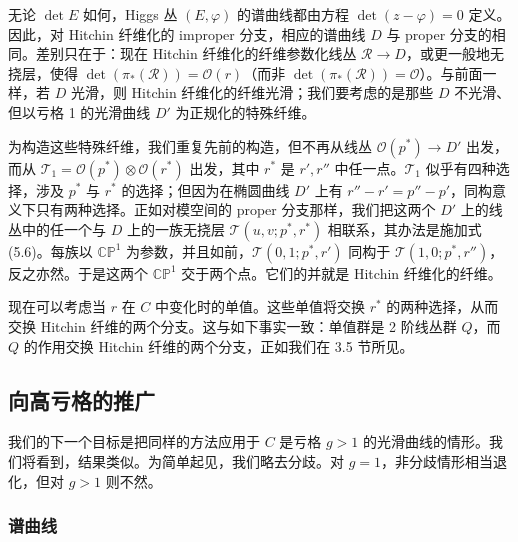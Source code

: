 

无论 $\det E$ 如何，Higgs 丛 $(E,\varphi)$ 的谱曲线都由方程 $\det(z-\varphi) = 0$ 定义。因此，对 Hitchin 纤维化的 improper 分支，相应的谱曲线 $D$ 与 proper 分支的相同。差别只在于：现在 Hitchin 纤维化的纤维参数化线丛 $\mathcal{R}\to D$，或更一般地无挠层，使得 $\det(\pi_*(\mathcal{R})) = \mathcal{O}(r)$（而非 $\det(\pi_*(\mathcal{R})) = \mathcal{O}$）。与前面一样，若 $D$ 光滑，则 Hitchin 纤维化的纤维光滑；我们要考虑的是那些 $D$ 不光滑、但以亏格 1 的光滑曲线 $D'$ 为正规化的特殊纤维。

为构造这些特殊纤维，我们重复先前的构造，但不再从线丛 $\mathcal{O}(p^*)\to D'$ 出发，而从 $\mathcal{T}_1 = \mathcal{O}(p^*)\otimes\mathcal{O}(r^*)$ 出发，其中 $r^*$ 是 $r',r''$ 中任一点。$\mathcal{T}_1$ 似乎有四种选择，涉及 $p^*$ 与 $r^*$ 的选择；但因为在椭圆曲线 $D'$ 上有 $r''-r' = p''-p'$，同构意义下只有两种选择。正如对模空间的 proper 分支那样，我们把这两个 $D'$ 上的线丛中的任一个与 $D$ 上的一族无挠层 $\mathcal{T}(u,v;p^*,r^*)$ 相联系，其办法是施加式 (5.6)。每族以 $\mathbb{CP}^1$ 为参数，并且如前，$\mathcal{T}(0,1;p^*,r')$ 同构于 $\mathcal{T}(1,0;p^*,r'')$，反之亦然。于是这两个 $\mathbb{CP}^1$ 交于两个点。它们的并就是 Hitchin 纤维化的纤维。

现在可以考虑当 $r$ 在 $C$ 中变化时的单值。这些单值将交换 $r^*$ 的两种选择，从而交换 Hitchin 纤维的两个分支。这与如下事实一致：单值群是 2 阶线丛群 $Q$，而 $Q$ 的作用交换 Hitchin 纤维的两个分支，正如我们在 3.5 节所见。

\subsection{向高亏格的推广}

我们的下一个目标是把同样的方法应用于 $C$ 是亏格 $g>1$ 的光滑曲线的情形。我们将看到，结果类似。为简单起见，我们略去分歧。对 $g=1$，非分歧情形相当退化，但对 $g>1$ 则不然。

\subsubsection{谱曲线}


